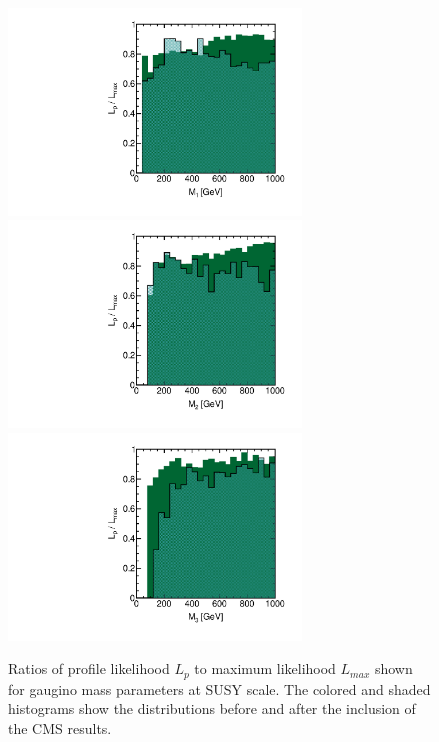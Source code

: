 \begin{figure}[htbp]
\begin{center}
\includegraphics[height=5.5cm]{figs/fig_M_1.pdf} 
\includegraphics[height=5.5cm]{figs/fig_M_2.pdf} \\
\includegraphics[height=5.5cm]{figs/fig_M_3.pdf}
\caption{Ratios of profile likelihood $L_p$ to maximum likelihood $L_{max}$ shown for gaugino mass parameters at  SUSY scale.  The colored and shaded histograms show the distributions before and after the inclusion of the CMS results.}
\label{fig:LRwcms_M}
\end{center}
\end{figure}


